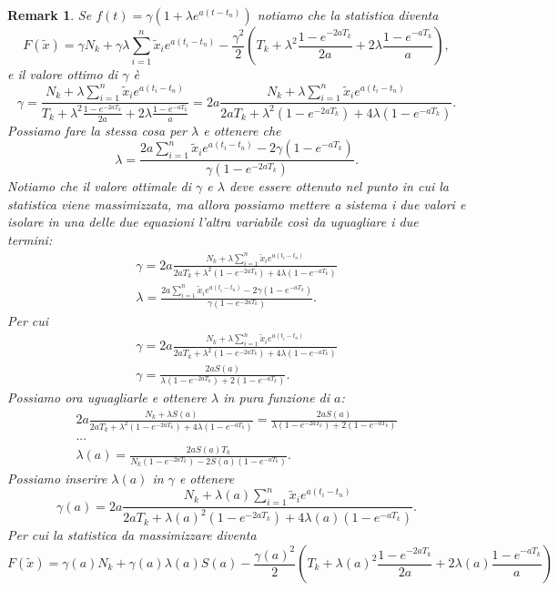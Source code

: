 \documentclass[10pt,a4paper]{report}
\newtheorem{remark}{Remark}
\begin{document}
\begin{remark}
Se $f(t)=\gamma(1+\lambda e^{a(t-t_n)})$ notiamo che la statistica diventa
$$
F(\tilde{x}) = \gamma N_k+\gamma\lambda\sum_{i=1}^n\tilde{x}_ie^{a(t_i-t_n)}-\frac{\gamma^2}{2}\left(T_k+\lambda^2\frac{1-e^{-2aT_k}}{2a}+2\lambda\frac{1-e^{-aT_k}}{a}\right),
$$
e il valore ottimo di $\gamma$ è
\begin{equation}\label{opt_gamma_gauss}
\gamma = \frac{N_k+\lambda\sum_{i=1}^n\tilde{x}_ie^{a(t_i-t_n)}}{T_k+\lambda^2\frac{1-e^{-2aT_k}}{2a}+2\lambda\frac{1-e^{-aT_k}}{a}} = 
2a\frac{N_k+\lambda\sum_{i=1}^n\tilde{x}_ie^{a(t_i-t_n)}}{2aT_k+\lambda^2(1-e^{-2aT_k})+4\lambda(1-e^{-aT_k})}.
\end{equation}
Possiamo fare la stessa cosa per $\lambda$ e ottenere che 
$$
\lambda = \frac{2a\sum_{i=1}^n\tilde{x}_ie^{a(t_i-t_n)}-2\gamma(1-e^{-aT_k})}{\gamma(1-e^{-2aT_k})}.
$$
Notiamo che il valore ottimale di $\gamma$ e $\lambda$ deve essere ottenuto nel punto in cui la statistica viene massimizzata, ma allora possiamo mettere a sistema i due valori e isolare in una delle due equazioni l'altra variabile così da uguagliare i due termini:
\begin{gather*}
\gamma = 2a\frac{N_k+\lambda\sum_{i=1}^n\tilde{x}_ie^{a(t_i-t_n)}}{2aT_k+\lambda^2(1-e^{-2aT_k})+4\lambda(1-e^{-aT_k})}\\
\lambda = \frac{2a\sum_{i=1}^n\tilde{x}_ie^{a(t_i-t_n)}-2\gamma(1-e^{-aT_k})}{\gamma(1-e^{-2aT_k})}.
\end{gather*}
Per cui
\begin{gather*}
\gamma = 2a\frac{N_k+\lambda\sum_{i=1}^n\tilde{x}_ie^{a(t_i-t_n)}}{2aT_k+\lambda^2(1-e^{-2aT_k})+4\lambda(1-e^{-aT_k})}\\
\gamma = \frac{2aS(a)}{\lambda(1-e^{-2aT_k})+2(1-e^{-aT_k})}.
\end{gather*}
Possiamo ora uguagliarle e ottenere $\lambda$ in pura funzione di $a$:
\begin{gather*}
2a\frac{N_k+\lambda S(a)}{2aT_k+\lambda^2(1-e^{-2aT_k})+4\lambda(1-e^{-aT_k})} = \frac{2aS(a)}{\lambda(1-e^{-2aT_k})+2(1-e^{-aT_k})}\\
...\\
\lambda(a) = \frac{2aS(a)T_k}{N_k(1-e^{-2aT_k})-2S(a)(1-e^{-aT_k})}.
\end{gather*}
Possiamo inserire $\lambda(a)$ in $\gamma$ e ottenere 
$$
\gamma(a) = 2a\frac{N_k+\lambda(a)\sum_{i=1}^n\tilde{x}_ie^{a(t_i-t_n)}}{2aT_k+\lambda(a)^2(1-e^{-2aT_k})+4\lambda(a)(1-e^{-aT_k})}.
$$
Per cui la statistica da massimizzare diventa
$$
F(\tilde{x}) = \gamma(a) N_k+\gamma(a)\lambda(a)S(a)-\frac{\gamma(a)^2}{2}\left(T_k+\lambda(a)^2\frac{1-e^{-2aT_k}}{2a}+2\lambda(a)\frac{1-e^{-aT_k}}{a}\right)
$$
\end{remark}
\end{document}
